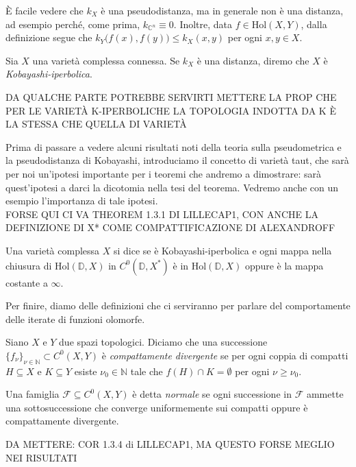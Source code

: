 \begin{oss}
    È facile vedere che $k_X$ è una pseudodistanza, ma in generale non è una distanza, ad esempio perché, come prima, $k_{\mathbb{C}^n}\equiv 0$. Inoltre, data $f \in \text{Hol}(X,Y)$, dalla definizione segue che $k_Y\big(f(x),f(y)\big) \le k_X(x,y)$ per ogni $x,y \in X$.
\end{oss}

\begin{defn}
    Sia $X$ una varietà complessa connessa. Se $k_X$ è una distanza, diremo che $X$ è \textit{Kobayashi-iperbolica}.
\end{defn}

DA QUALCHE PARTE POTREBBE SERVIRTI METTERE LA PROP CHE PER LE VARIETÀ K-IPERBOLICHE LA TOPOLOGIA INDOTTA DA K È LA STESSA CHE QUELLA DI VARIETÀ

Prima di passare a vedere alcuni risultati noti della teoria sulla pseudometrica e la pseudodistanza di Kobayashi, introduciamo il concetto di varietà taut, che sarà per noi un'ipotesi importante per i teoremi che andremo a dimostrare: sarà quest'ipotesi a darci la dicotomia nella tesi del teorema. Vedremo anche con un esempio l'importanza di tale ipotesi. \\

FORSE QUI CI VA THEOREM 1.3.1 DI LILLECAP1, CON ANCHE LA DEFINIZIONE DI X* COME COMPATTIFICAZIONE DI ALEXANDROFF

\begin{defn}
    Una varietà complessa $X$ si dice  se è Kobayashi-iperbolica e ogni mappa nella chiusura di $\text{Hol}(\mathbb{D},X)$ in $C^0(\mathbb{D},X^*)$ è in $\text{Hol}(\mathbb{D},X)$ oppure è la mappa costante a $\infty$.
\end{defn}

Per finire, diamo delle definizioni che ci serviranno per parlare del comportamente delle iterate di funzioni olomorfe.

\begin{defn}
    Siano $X$ e $Y$ due spazi topologici. Diciamo che una successione $\{f_{\nu}\}_{\nu \in \mathbb{N}} \subset C^0(X,Y)$ è \textit{compattamente divergente} se per ogni coppia di compatti $H\subseteq X$ e $K\subseteq Y$ esiste $\nu_0 \in \mathbb{N}$ tale che $f(H)\cap K=\emptyset$ per ogni $\nu \ge \nu_0$.

    Una famiglia $\mathcal{F} \subseteq C^0(X,Y)$ è detta \textit{normale} se ogni successione in $\mathcal{F}$ ammette una sottosuccessione che converge uniformemente sui compatti oppure è compattamente divergente.
\end{defn}

DA METTERE: COR 1.3.4 di LILLECAP1, MA QUESTO FORSE MEGLIO NEI RISULTATI